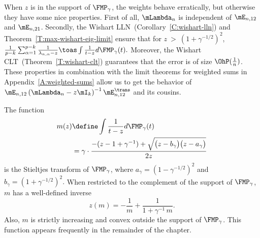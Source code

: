 When $z$ is in the support of $\FMP_\gamma$, the weights behave
erratically, but otherwise they have some nice properties.
First of all, $\mLambda_n$ is independent of $\mE_{n,12}$ and $\mE_{n,21}$.
Secondly, the Wishart LLN~(Corollary~\ref{C:wishart-lln}) and
Theorem~\ref{T:max-wishart-eig-limit} ensure that for
$z~>~(1+\gamma^{-1/2})^2$,
\(
    \frac{1}{p-k}
    \sum_{\alpha=1}^{p-k}
        \frac{1}{\lambda_{n,\alpha} - z}
    \toas
    \int
        \frac{1}{t - z}
        d\FMP_\gamma(t).
\)
Moreover, the Wishart CLT~(Theorem~\ref{T:wishart-clt}) guarantees that
the error is of size $\OhP(\frac{1}{n})$.  These properties in
combination with the limit theorems for weighted sums in 
Appendix~\ref{A:weighted-sums} allow us to get the behavior of
\(
    \mE_{n,12}
    \left(
        \mLambda_n
        -
        z
        \mI_k
    \right)^{-1}
    \mE_{n,12}^\trans
\)
and its cousins.

The function
\begin{align}
    m(z)
        &\define
            \int
                \frac{1}{t - z} d\FMP_\gamma(t) \notag \\
        &=
            \gamma
            \cdot
            \frac{ -(z - 1 + \gamma^{-1})
                   +\sqrt{ \big( z - b_\gamma \big) 
                           \big( z - a_\gamma \big) } }
                 { 2 z }
\end{align}
is the Stieltjes transform of $\FMP_\gamma$, 
where
\(
    a_\gamma = \left( 1 - \gamma^{-1/2} \right)^2
\)
and
\(
    b_\gamma = \left( 1 + \gamma^{-1/2} \right)^2.
\)
When restricted to the complement of the support of $\FMP_\gamma$, $m$ has a well-defined inverse
\begin{equation}\label{E:stieltjes-inverse}
    z(m)
        = 
            -
            \frac{1}{m}
            +
            \frac{1}{1 + \gamma^{-1} \, m}.
\end{equation}
Also, $m$ is strictly increasing and convex outside the support of
$\FMP_\gamma$.  This function appears frequently in the remainder of the chapter.

